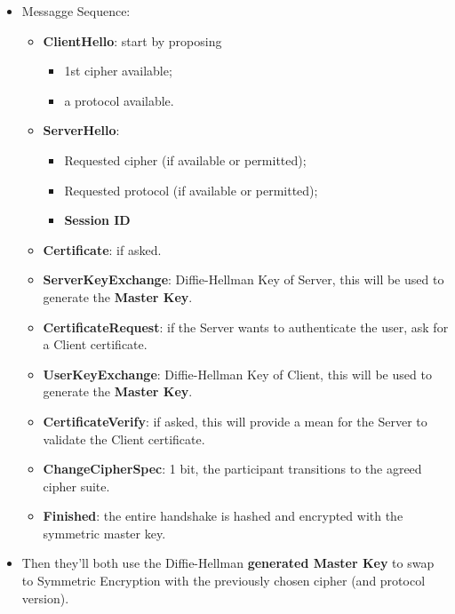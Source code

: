 \documentclass[9pt, letterpaper]{article}
\begin{document}
\begin{itemize}
	\item Messagge Sequence:
	      \begin{itemize}
		      \item \textbf{ClientHello}: start by proposing
		            \begin{itemize}
			            \item 1st cipher available;
			            \item a protocol available.
		            \end{itemize}
		      \item \textbf{ServerHello}:
		            \begin{itemize}
			            \item Requested cipher (if available or permitted);
			            \item Requested protocol (if available or permitted);
			            \item \textbf{Session ID}
		            \end{itemize}
		      \item \textbf{Certificate}: if asked.
		      \item \textbf{ServerKeyExchange}: Diffie-Hellman Key of Server, this will be used to generate the \textbf{Master Key}.
		      \item \textbf{CertificateRequest}: if the Server wants to authenticate the user, ask for a Client certificate.
		      \item \textbf{UserKeyExchange}: Diffie-Hellman Key of Client, this will be used to generate the \textbf{Master Key}.
		      \item \textbf{CertificateVerify}: if asked, this will provide a mean for the Server to validate the Client certificate.
		      \item \textbf{ChangeCipherSpec}: 1 bit, the participant transitions to the agreed cipher suite.
		      \item \textbf{Finished}: the entire handshake is hashed and encrypted with the symmetric master key.
	      \end{itemize}
	\item Then they'll both use the Diffie-Hellman \textbf{generated Master Key} to swap to Symmetric Encryption with the previously chosen cipher (and protocol version).
\end{itemize}
\end{document}
